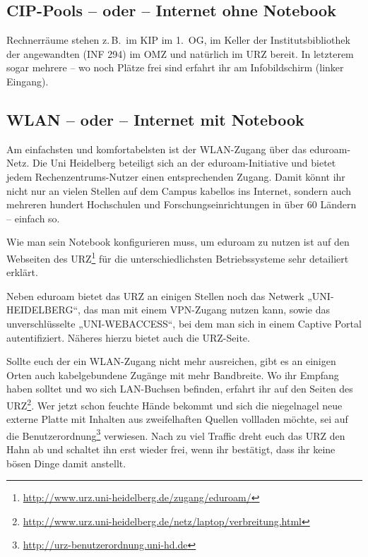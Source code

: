 \subsection*{CIP-Pools -- oder -- Internet ohne Notebook}
Rechnerräume stehen z.\,B.\ im \gls{KIP} im 1.~OG, im Keller der Institutsbibliothek der angewandten (\Gls{INF} 294) %
im \Gls{OMZ} und natürlich im \gls{URZ} bereit. In letzterem sogar mehrere -- wo noch Plätze frei sind erfahrt ihr am Infobildschirm (linker Eingang).

\subsection*{WLAN -- oder -- Internet mit Notebook}
Am einfachsten und komfortabelsten ist der WLAN-Zugang über das eduroam-Netz.
Die Uni Heidelberg beteiligt sich an der eduroam-Initiative und bietet jedem Rechenzentrums-Nutzer einen entsprechenden Zugang. Damit könnt ihr nicht nur an vielen Stellen auf dem Campus kabellos ins Internet, sondern auch mehreren hundert Hochschulen und Forschungseinrichtungen in über 60 Ländern – einfach so.

Wie man sein Notebook konfigurieren muss, um eduroam zu nutzen ist auf den Webseiten des URZ\footnote{\url{http://www.urz.uni-heidelberg.de/zugang/eduroam/}} für die unterschiedlichsten Betriebssysteme sehr detailiert erklärt.

Neben eduroam bietet das URZ an einigen Stellen noch das Netwerk „UNI-HEIDELBERG“, das man mit einem VPN-Zugang nutzen kann, sowie das unverschlüsselte „UNI-WEBACCESS“, bei dem man sich in einem Captive Portal autentifiziert. Näheres hierzu bietet auch die URZ-Seite.%

Sollte euch der ein WLAN-Zugang nicht mehr ausreichen, gibt es an einigen Orten auch kabelgebundene Zugänge mit mehr Bandbreite. Wo ihr Empfang haben solltet und wo sich LAN-Buchsen befinden, erfahrt ihr auf den Seiten des \gls{URZ}\footnote{\url{http://www.urz.uni-heidelberg.de/netz/laptop/verbreitung.html}}. Wer jetzt schon feuchte Hände bekommt und sich die niegelnagel neue externe Platte mit Inhalten aus zweifelhaften Quellen vollladen möchte, sei auf die Benutzerordnung\footnote{\url{http://urz-benutzerordnung.uni-hd.de}} verwiesen. Nach zu viel Traffic dreht euch das \gls{URZ} den Hahn ab und schaltet ihn erst wieder frei, wenn ihr bestätigt, dass ihr keine bösen Dinge damit anstellt.

